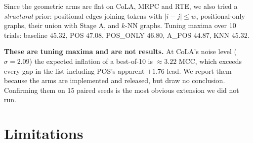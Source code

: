 \documentclass{article}
\begin{document}
Since the geometric arms are flat on CoLA, MRPC and RTE, we also tried a
\emph{structural} prior: positional edges joining tokens with $|i-j| \leq w$,
positional-only graphs, their union with Stage A, and $k$-NN graphs. Tuning
maxima over 10 trials: baseline $45.32$, POS $47.08$, POS\_ONLY $46.80$, A\_POS
$44.87$, KNN $45.32$.

\textbf{These are tuning maxima and are not results.} At CoLA's noise level
($\sigma = 2.09$) the expected inflation of a best-of-10 is $\approx 3.22$ MCC,
which exceeds every gap in the list including POS's apparent $+1.76$ lead. We
report them because the arms are implemented and released, but draw no
conclusion. Confirming them on 15 paired seeds is the most obvious extension we
did not run.

\section{Limitations}
\label{app:limitations}
\end{document}
